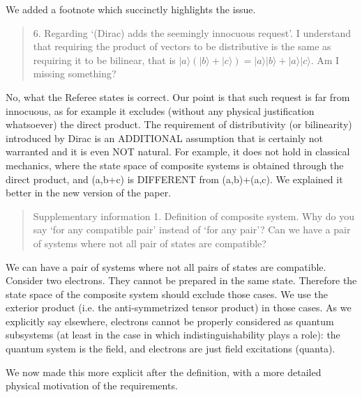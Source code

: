 \documentclass[11pt]{article}
\def\>{\rangle}
\begin{document}
We added a footnote which succinctly highlights
the issue. 

\begin{quote}
6. Regarding `(Dirac) adds the seemingly innocuous
request'. I understand that requiring the product of vectors to be
distributive is the same as requiring it to be bilinear, that is $|a\>
(|b\> + |c\>) = |a\>|b\> + |a\>|c\>$. Am I missing something?
\end{quote}

No, what the Referee states is correct. Our point is that such request
is far from innocuous, as for example it excludes (without any
physical justification whatsoever) the direct product. The requirement
of distributivity (or bilinearity) introduced by Dirac is an
ADDITIONAL assumption that is certainly not warranted and it is even
NOT natural. For example, it does not hold in classical mechanics,
where the state space of composite systems is obtained through the
direct product, and (a,b+c) is DIFFERENT from (a,b)+(a,c). We explained it better in the new version of the paper.

\begin{quote}
Supplementary information 1. Definition of composite
system. Why do you say `for any compatible pair' instead of `for any
pair'? Can we have a pair of systems where not all pair of states are
compatible?
\end{quote}

We can have a pair of systems where not all pairs of states are
compatible. Consider two electrons. They cannot be prepared in the
same state. Therefore the state space of the composite system should
exclude those cases. We use the exterior product (i.e. the
anti-symmetrized tensor product) in those cases. As we explicitly say
elsewhere, electrons cannot be properly considered as quantum
subsystems (at least in the case in which indistinguishability plays a
role): the quantum system is the field, and electrons are just field
excitations (quanta).

We now made this more explicit after the definition, with a more detailed physical motivation of the requirements. 
\end{document}
